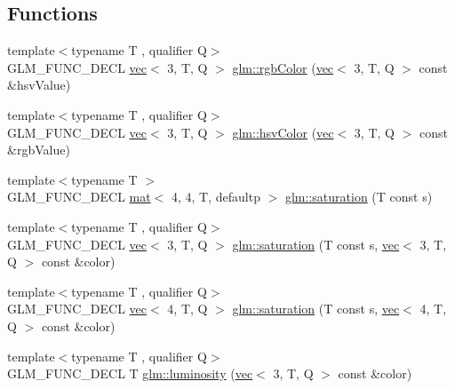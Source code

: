 \subsection*{Functions}
\begin{DoxyCompactItemize}
\item 
{\footnotesize template$<$typename T , qualifier Q$>$ }\\G\+L\+M\+\_\+\+F\+U\+N\+C\+\_\+\+D\+E\+CL \hyperlink{structglm_1_1vec}{vec}$<$ 3, T, Q $>$ \hyperlink{group__gtx__color__space_ga5f9193be46f45f0655c05a0cdca006db}{glm\+::rgb\+Color} (\hyperlink{structglm_1_1vec}{vec}$<$ 3, T, Q $>$ const \&hsv\+Value)
\item 
{\footnotesize template$<$typename T , qualifier Q$>$ }\\G\+L\+M\+\_\+\+F\+U\+N\+C\+\_\+\+D\+E\+CL \hyperlink{structglm_1_1vec}{vec}$<$ 3, T, Q $>$ \hyperlink{group__gtx__color__space_ga789802bec2d4fe0f9741c731b4a8a7d8}{glm\+::hsv\+Color} (\hyperlink{structglm_1_1vec}{vec}$<$ 3, T, Q $>$ const \&rgb\+Value)
\item 
{\footnotesize template$<$typename T $>$ }\\G\+L\+M\+\_\+\+F\+U\+N\+C\+\_\+\+D\+E\+CL \hyperlink{structglm_1_1mat}{mat}$<$ 4, 4, T, defaultp $>$ \hyperlink{group__gtx__color__space_ga01a97152b44e1550edcac60bd849e884}{glm\+::saturation} (T const s)
\item 
{\footnotesize template$<$typename T , qualifier Q$>$ }\\G\+L\+M\+\_\+\+F\+U\+N\+C\+\_\+\+D\+E\+CL \hyperlink{structglm_1_1vec}{vec}$<$ 3, T, Q $>$ \hyperlink{group__gtx__color__space_ga2156cea600e90148ece5bc96fd6db43a}{glm\+::saturation} (T const s, \hyperlink{structglm_1_1vec}{vec}$<$ 3, T, Q $>$ const \&color)
\item 
{\footnotesize template$<$typename T , qualifier Q$>$ }\\G\+L\+M\+\_\+\+F\+U\+N\+C\+\_\+\+D\+E\+CL \hyperlink{structglm_1_1vec}{vec}$<$ 4, T, Q $>$ \hyperlink{group__gtx__color__space_gaba0eacee0736dae860e9371cc1ae4785}{glm\+::saturation} (T const s, \hyperlink{structglm_1_1vec}{vec}$<$ 4, T, Q $>$ const \&color)
\item 
{\footnotesize template$<$typename T , qualifier Q$>$ }\\G\+L\+M\+\_\+\+F\+U\+N\+C\+\_\+\+D\+E\+CL T \hyperlink{group__gtx__color__space_gad028e0a4f1a9c812b39439b746295b34}{glm\+::luminosity} (\hyperlink{structglm_1_1vec}{vec}$<$ 3, T, Q $>$ const \&color)
\end{DoxyCompactItemize}


